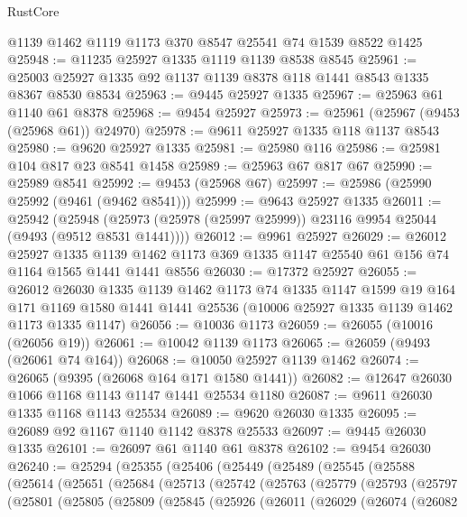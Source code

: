 \begin{lexlean}{RustCore}
\begin{coremodule}
    @1139
    @1462
    @1119
    @1173
    @370
    @8547
    @25541
    @74
    @1539
    @8522
    @1425
@25948 := @11235 @25927 @1335 @1119 @1139 @8538 @8545
@25961 := @25003 @25927 @1335 @92 @1137 @1139 @8378 @118 @1441 @8543 @1335 @8367 @8530 @8534
@25963 := @9445 @25927 @1335
@25967 := @25963 @61 @1140 @61 @8378
@25968 := @9454 @25927
@25973 := @25961 (@25967 (@9453 (@25968 @61)) @24970)
@25978 := @9611 @25927 @1335 @118 @1137 @8543
@25980 := @9620 @25927 @1335
@25981 := @25980 @116
@25986 := @25981 @104 @817 @23 @8541 @1458
@25989 := @25963 @67 @817 @67
@25990 := @25989 @8541
@25992 := @9453 (@25968 @67)
@25997 := @25986 (@25990 @25992 (@9461 (@9462 @8541)))
@25999 := @9643 @25927 @1335
@26011 := @25942
    (@25948 (@25973 (@25978 (@25997 @25999)) @23116 @9954 @25044 (@9493 (@9512 @8531 @1441))))
@26012 := @9961 @25927
@26029 := @26012
    @25927
    @1335
    @1139
    @1462
    @1173
    @369
    @1335
    @1147
    @25540
    @61
    @156
    @74
    @1164
    @1565
    @1441
    @1441
    @8556
@26030 := @17372 @25927
@26055 := @26012
    @26030
    @1335
    @1139
    @1462
    @1173
    @74
    @1335
    @1147
    @1599
    @19
    @164
    @171
    @1169
    @1580
    @1441
    @1441
    @25536
    (@10006 @25927 @1335 @1139 @1462 @1173 @1335 @1147)
@26056 := @10036 @1173
@26059 := @26055 (@10016 (@26056 @19))
@26061 := @10042 @1139 @1173
@26065 := @26059 (@9493 (@26061 @74 @164))
@26068 := @10050 @25927 @1139 @1462
@26074 := @26065 (@9395 (@26068 @164 @171 @1580 @1441))
@26082 := @12647 @26030 @1066 @1168 @1143 @1147 @1441 @25534 @1180
@26087 := @9611 @26030 @1335 @1168 @1143 @25534
@26089 := @9620 @26030 @1335
@26095 := @26089 @92 @1167 @1140 @1142 @8378 @25533
@26097 := @9445 @26030 @1335
@26101 := @26097 @61 @1140 @61 @8378
@26102 := @9454 @26030
@26240 := @25294
    (@25355
      (@25406
        (@25449
          (@25489
            (@25545
              (@25588
                (@25614
                  (@25651
                    (@25684
                      (@25713
                        (@25742
                          (@25763
                            (@25779
                              (@25793
                                (@25797
                                  (@25801
                                    (@25805
                                      (@25809
                                        (@25845
                                          (@25926
                                            (@26011
                                              (@26029
                                                (@26074
                                                  (@26082

\end{coremodule}
\end{lexlean}
